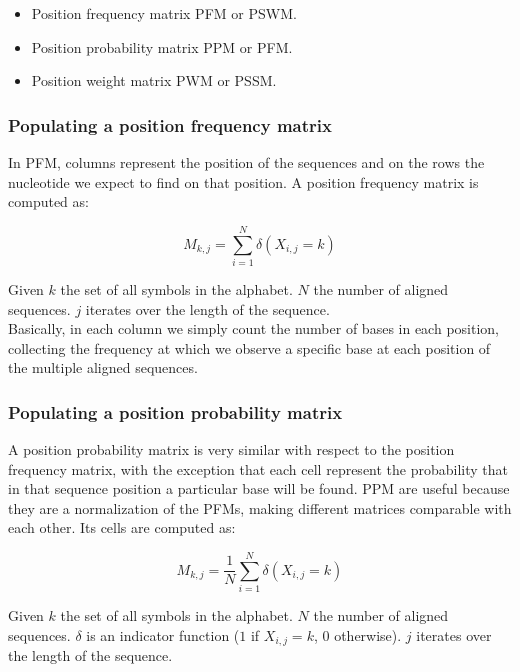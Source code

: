 	\begin{multicols}{2}
		\begin{itemize}
			\item Position frequency matrix PFM or PSWM.
			\item Position probability matrix PPM or PFM.
			\item Position weight matrix PWM or PSSM.
		\end{itemize}
	\end{multicols}

		\subsubsection{Populating a position frequency matrix}
		In PFM, columns represent the position of the sequences and on the rows the nucleotide we expect to find on that position.
		A position frequency matrix is computed as:

		$$M_{k,j} = \sum\limits_{i=1}^N\delta(X_{i,j} = k)$$

		Given $k$ the set of all symbols in the alphabet.
		$N$ the number of aligned sequences.
		$j$ iterates over the length of the sequence.
		\\
		Basically, in each column we simply count the number of bases in each position, collecting the frequency at which we observe a specific base at each position of the multiple aligned sequences.

		\subsubsection{Populating a position probability matrix}
		A position probability matrix is very similar with respect to the position frequency matrix, with the exception that each cell represent the probability that in that sequence position a particular base will be found.
		PPM are useful because they are a normalization of the PFMs, making different matrices comparable with each other.
		Its cells are computed as:

		$$M_{k,j} = \frac{1}{N}\sum\limits_{i=1}^N\delta(X_{i,j} = k)$$
		
		Given $k$ the set of all symbols in the alphabet.
		$N$ the number of aligned sequences.
		$\delta$ is an indicator function ($1$ if $X_{i,j} = k$, $0$ otherwise).
		$j$ iterates over the length of the sequence.

